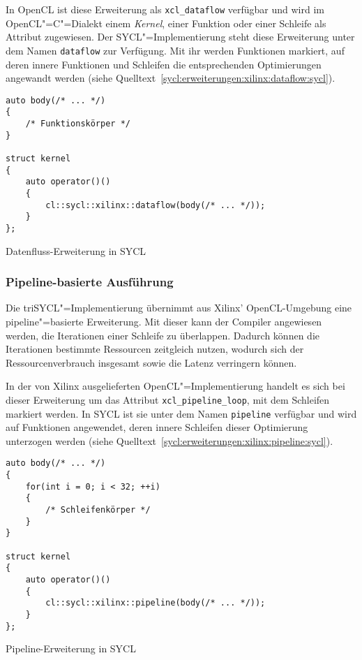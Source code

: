 In OpenCL ist diese Erweiterung als \texttt{xcl\_dataflow} verfügbar und wird
im OpenCL"=C"=Dialekt einem \textit{Kernel}, einer Funktion oder einer Schleife als
Attribut zugewiesen. Der SYCL"=Implementierung steht diese Erweiterung unter dem
Namen \texttt{dataflow} zur Verfügung. Mit ihr werden Funktionen markiert, auf
deren innere Funktionen und Schleifen die entsprechenden Optimierungen angewandt
werden (siehe Quelltext~\ref{sycl:erweiterungen:xilinx:dataflow:sycl}).

\begin{code}
    \begin{verbatim}
auto body(/* ... */)
{
    /* Funktionskörper */
}

struct kernel
{
    auto operator()()
    {
        cl::sycl::xilinx::dataflow(body(/* ... */));
    }
};
    \end{verbatim}
    \caption{Datenfluss-Erweiterung in SYCL}
    \label{sycl:erweiterungen:xilinx:dataflow:sycl}
\end{code}

\subsubsection{Pipeline-basierte Ausführung}
\label{sycl:erweiterungen:xilinx:pipeline}

Die triSYCL"=Implementierung übernimmt aus Xilinx' OpenCL-Umgebung eine
pipeline"=basierte Erweiterung. Mit dieser kann der Compiler angewiesen werden,
die Iterationen einer Schleife zu überlappen. Dadurch können die Iterationen
bestimmte Ressourcen zeitgleich nutzen, wodurch sich der Ressourcenverbrauch
insgesamt sowie die Latenz verringern können.
\cite[siehe][67\psqq]{sdaccelopt2019}

In der von Xilinx ausgelieferten OpenCL"=Implementierung handelt es sich bei
dieser Erweiterung um das Attribut \texttt{xcl\_pipeline\_loop}, mit dem
Schleifen markiert werden. In SYCL ist sie unter dem Namen \texttt{pipeline}
verfügbar und wird auf Funktionen angewendet, deren innere Schleifen dieser
Optimierung unterzogen werden (siehe
Quelltext~\ref{sycl:erweiterungen:xilinx:pipeline:sycl}).

\begin{code}
    \begin{verbatim}
auto body(/* ... */)
{
    for(int i = 0; i < 32; ++i)
    {
        /* Schleifenkörper */
    }
}

struct kernel
{
    auto operator()()
    {
        cl::sycl::xilinx::pipeline(body(/* ... */));
    }
};
    \end{verbatim}
    \caption{Pipeline-Erweiterung in SYCL}
    \label{sycl:erweiterungen:xilinx:pipeline:sycl}
\end{code}

